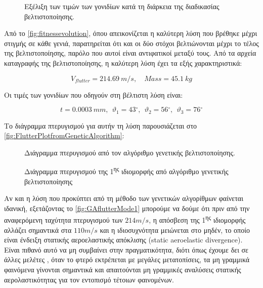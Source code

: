\begin{figure}[H]
    \centering
    
    \caption{Εξέλιξη των τιμών των γονιδίων κατά τη διάρκεια της διαδικασίας βελτιστοποίησης.}
\end{figure}



Από το \autoref{fig:fitnessevolution}, όπου απεικονίζεται η καλύτερη λύση που βρέθηκε μέχρι στιγμής σε κάθε γενιά, παρατηρείται ότι και οι δύο στόχοι βελτιώνονται μέχρι το τέλος της βελτιστοποίησης, παρόλο που αυτοί είναι αντιφατικοί μεταξύ τους. Από τα αρχεία καταγραφής της βελτιστοποίησης, η καλύτερη λύση έχει τα εξής χαρακτηριστικά:


\begin{equation}
V_{flutter} = 214.69\ m/s,\quad Mass = 45.1\ kg
\end{equation}

Οι τιμές των γονιδίων που οδηγούν στη βέλτιστη λύση είναι:


\begin{equation}
t = 0.0003\ mm,\ \ \vartheta_{1} = 43{^\circ},\ \ \vartheta_{2} = 56{^\circ},\ \ \vartheta_{3} = 76{^\circ}
\end{equation}

Το διάγραμμα πτερυγισμού  για αυτήν τη λύση παρουσιάζεται στο \autoref{fig:FlutterPlotfromGeneticAlgorithm}:

\begin{figure}[H]
    \centering
    
    \caption{Διάγραμμα πτερυγισμού  από τον αλγόριθμο γενετικής βελτιστοποίησης.}
    \label{fig:FlutterPlotfromGeneticAlgorithm}
\end{figure}

\begin{figure}[H]
    \centering
    
    \caption{Διάγραμμα πτερυγισμού της 1\textsuperscript{ης} ιδιομορφής από αλγόριθμο γενετικής βελτιστοποίησης}
    \label{fig:GAflutterMode1}
\end{figure}

Αν και η λύση που προκύπτει από τη μέθοδο των γενετικών αλγορίθμων φαίνεται ιδανική, εξετάζοντας το \autoref{fig:GAflutterMode1} μπορούμε να δούμε ότι πριν από την αναφερόμενη ταχύτητα πτερυγισμού των $214 m/s$, η απόσβεση  της 1\textsuperscript{ης} ιδιομορφής αλλάζει σημαντικά στα $110 m/s$ και η ιδιοσυχνότητα μειώνεται στο μηδέν, το οποίο είναι ένδειξη στατικής αεροελαστικής απόκλισης \textlatin{(static aeroelastic divergence)}. Είναι πιθανό αυτό να μη συμβαίνει στην πραγματικότητα, διότι όπως έχουμε δει σε άλλες μελέτες \cite{NonlinearAeroelasticStability}, όταν το φτερό εκτρέπεται με μεγάλες μετατοπίσεις, τα μη γραμμικά φαινόμενα γίνονται σημαντικά και απαιτούνται μη γραμμικές αναλύσεις στατικής αερολαστικότητας για τον εντοπισμό τέτοιων φαινομένων.

